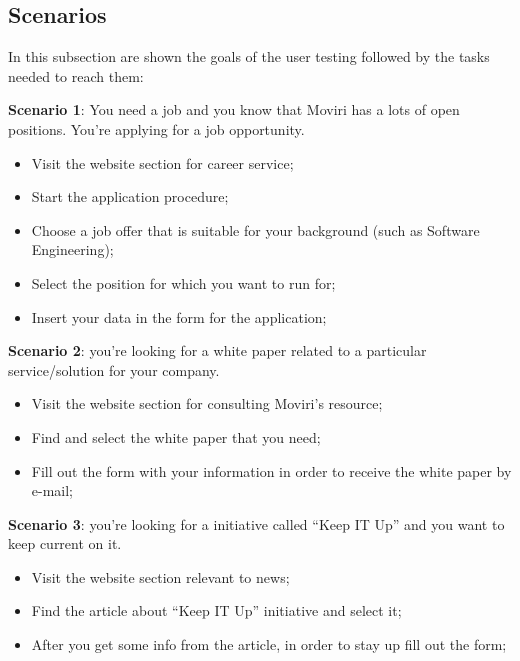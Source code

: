 \subsection{Scenarios}
In this subsection are shown the goals of the user testing followed by the tasks needed to reach them:\par
\textbf{Scenario 1}: You need a job and you know that Moviri has a lots of open positions. You’re applying for a job opportunity.
\begin{itemize}
\item Visit the website section for career service;
\item Start the application procedure;
\item Choose a job offer that is suitable for your background (such as Software Engineering); 
\item Select the position for which you want to run for;
\item Insert your data in the form for the application;
\end{itemize}\par
\textbf{Scenario 2}: you’re looking for a white paper related to a particular service/solution for your company.
\begin{itemize}
\item Visit the website section for consulting Moviri’s resource;
\item Find and select the white paper that you need;
\item Fill out the form with your information in order to receive the white paper by e-mail;
\end{itemize}\par
\textbf{Scenario 3}: you’re looking for a initiative called “Keep IT Up” and you want to keep current on it.
\begin{itemize}
\item Visit the website section relevant to news;
\item Find the article about “Keep IT Up” initiative and select it;
\item After you get some info from the article, in order to stay up fill out the form;
\end{itemize}\par

